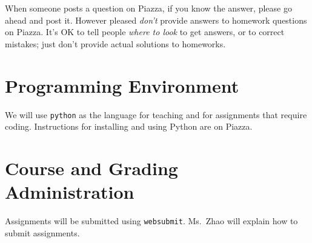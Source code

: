 \documentclass[11pt]{article}
\begin{document}
When someone posts a question on Piazza, if you know the answer, please
go ahead and post it.   However pleased \emph{don't} provide answers to homework
questions on Piazza.   It's OK to tell people \emph{where to look} to
get answers, or to correct mistakes;  just don't provide actual solutions
to homeworks.

\section*{Programming Environment}

We will use \texttt{python} as the language for teaching and for
assignments that require coding.    Instructions for installing and
using Python are on Piazza.






\section*{Course and Grading Administration}

Assignments will be submitted using \texttt{websubmit}.   Ms.\ Zhao will
explain how to submit assignments.  

\end{document}
